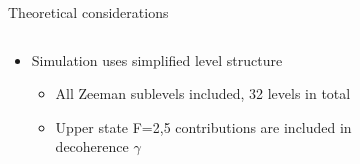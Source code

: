 \begin{block}{Theoretical considerations}
  \begin{columns}
    \begin{column}{0.49\textwidth}
  \begin{itemize}
  \item Simulation uses simplified level structure
    \begin{itemize}
    \item All Zeeman sublevels included, 32 levels in total
    \item Upper state F=2,5 contributions are included in decoherence $\gamma$
    \end{itemize}
    \end{itemize}
    \end{column}
    \begin{column}{0.49\textwidth}
      \begin{figure}
        \begin{center}
          \setlength\fboxsep{0pt}
          \setlength\fboxrule{0.5pt}
        \end{center}
      \end{figure}
    \end{column}
  \end{columns}


\end{block}
